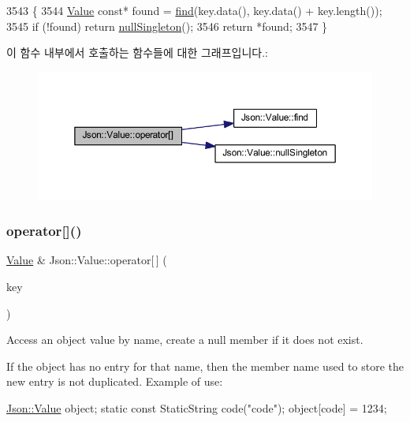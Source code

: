 \begin{DoxyCode}
3543 \{
3544   \hyperlink{class_json_1_1_value}{Value} \textcolor{keyword}{const}* found = \hyperlink{class_json_1_1_value_afb007b9ce9b2cf9d5f667a07e5e0349f}{find}(key.data(), key.data() + key.length());
3545   \textcolor{keywordflow}{if} (!found) \textcolor{keywordflow}{return} \hyperlink{class_json_1_1_value_af2f124567acc35d021a424e53ebdfcab}{nullSingleton}();
3546   \textcolor{keywordflow}{return} *found;
3547 \}
\end{DoxyCode}
이 함수 내부에서 호출하는 함수들에 대한 그래프입니다.\+:\nopagebreak
\begin{figure}[H]
\begin{center}
\leavevmode
\includegraphics[width=350pt]{class_json_1_1_value_aba60f69dcd85e935aa85e7a517e03427_cgraph}
\end{center}
\end{figure}
\mbox{\label{class_json_1_1_value_ac3763d7d315ca65dc188e273722f7955}} 
\subsubsection{\texorpdfstring{operator[]()}{operator[]()}\hspace{0.1cm}{\footnotesize\ttfamily [9/9]}}
{\footnotesize\ttfamily \hyperlink{class_json_1_1_value}{Value} \& Json\+::\+Value\+::operator\mbox{[}$\,$\mbox{]} (\begin{DoxyParamCaption}\item[{const \hyperlink{class_json_1_1_static_string}{Static\+String} \&}]{key }\end{DoxyParamCaption})}



Access an object value by name, create a null member if it does not exist. 

If the object has no entry for that name, then the member name used to store the new entry is not duplicated. Example of use\+: 
\begin{DoxyCode}
\hyperlink{class_json_1_1_value}{Json::Value} object;
\textcolor{keyword}{static} \textcolor{keyword}{const} StaticString code(\textcolor{stringliteral}{"code"});
\textcolor{keywordtype}{object}[code] = 1234;
\end{DoxyCode}
 

